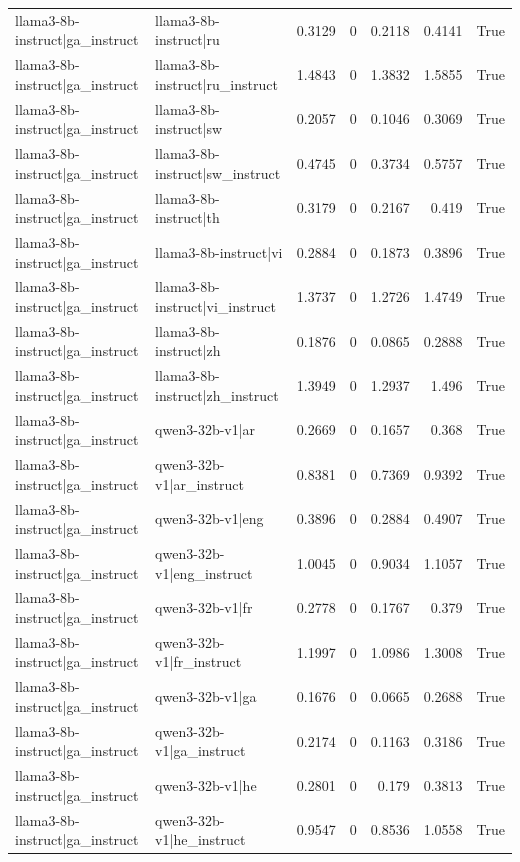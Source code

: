 \begin{table}
\begin{tabular}{l l r r r r l}
llama3-8b-instruct|ga_instruct & llama3-8b-instruct|ru & 0.3129 & 0 & 0.2118 & 0.4141 & True \\
llama3-8b-instruct|ga_instruct & llama3-8b-instruct|ru_instruct & 1.4843 & 0 & 1.3832 & 1.5855 & True \\
llama3-8b-instruct|ga_instruct & llama3-8b-instruct|sw & 0.2057 & 0 & 0.1046 & 0.3069 & True \\
llama3-8b-instruct|ga_instruct & llama3-8b-instruct|sw_instruct & 0.4745 & 0 & 0.3734 & 0.5757 & True \\
llama3-8b-instruct|ga_instruct & llama3-8b-instruct|th & 0.3179 & 0 & 0.2167 & 0.419 & True \\
llama3-8b-instruct|ga_instruct & llama3-8b-instruct|vi & 0.2884 & 0 & 0.1873 & 0.3896 & True \\
llama3-8b-instruct|ga_instruct & llama3-8b-instruct|vi_instruct & 1.3737 & 0 & 1.2726 & 1.4749 & True \\
llama3-8b-instruct|ga_instruct & llama3-8b-instruct|zh & 0.1876 & 0 & 0.0865 & 0.2888 & True \\
llama3-8b-instruct|ga_instruct & llama3-8b-instruct|zh_instruct & 1.3949 & 0 & 1.2937 & 1.496 & True \\
llama3-8b-instruct|ga_instruct & qwen3-32b-v1|ar & 0.2669 & 0 & 0.1657 & 0.368 & True \\
llama3-8b-instruct|ga_instruct & qwen3-32b-v1|ar_instruct & 0.8381 & 0 & 0.7369 & 0.9392 & True \\
llama3-8b-instruct|ga_instruct & qwen3-32b-v1|eng & 0.3896 & 0 & 0.2884 & 0.4907 & True \\
llama3-8b-instruct|ga_instruct & qwen3-32b-v1|eng_instruct & 1.0045 & 0 & 0.9034 & 1.1057 & True \\
llama3-8b-instruct|ga_instruct & qwen3-32b-v1|fr & 0.2778 & 0 & 0.1767 & 0.379 & True \\
llama3-8b-instruct|ga_instruct & qwen3-32b-v1|fr_instruct & 1.1997 & 0 & 1.0986 & 1.3008 & True \\
llama3-8b-instruct|ga_instruct & qwen3-32b-v1|ga & 0.1676 & 0 & 0.0665 & 0.2688 & True \\
llama3-8b-instruct|ga_instruct & qwen3-32b-v1|ga_instruct & 0.2174 & 0 & 0.1163 & 0.3186 & True \\
llama3-8b-instruct|ga_instruct & qwen3-32b-v1|he & 0.2801 & 0 & 0.179 & 0.3813 & True \\
llama3-8b-instruct|ga_instruct & qwen3-32b-v1|he_instruct & 0.9547 & 0 & 0.8536 & 1.0558 & True \\

\end{tabular}
\end{table}
